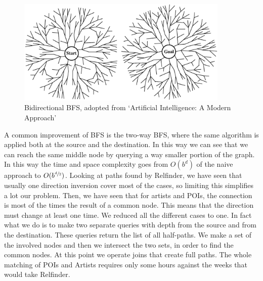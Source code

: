 \documentclass[paper=a4, fontsize=11pt]{scrartcl}
\begin{document}
\begin{figure}[!htb]
  \centering
    \includegraphics[width=0.9\textwidth]{images/bfs.png}
    \caption{Bidirectional BFS, adopted from `Artificial Intelligence: A Modern Approach'~\cite{artificial_intelligence}}
\end{figure}

A common improvement of BFS is the two-way BFS, where the same algorithm is applied both at the source and the destination. In this way we can see that we can reach the same middle node by querying a way smaller portion of the graph. In this way the time and space complexity goes from $O(b^d)$ of the naive approach to $O(b^{\sfrac{d}{2}})$.
Looking at paths found by Relfinder, we have seen that usually one direction inversion cover most of the cases, so limiting this simplifies a lot our problem. Then, we have seen that for artists and POIs, the connection is most of the times the result of a common node. This means that the direction must change at least one time. We reduced all the different cases to one. In fact what we do is to make two separate queries with depth from the source and from the destination. These queries return the list of all half-paths. We make a set of the involved nodes and then we intersect the two sets, in order to find the common nodes. At this point we operate joins that create full paths. The whole matching of POIs and Artists  requires only some hours against the weeks that would take Relfinder.
\end{document}
